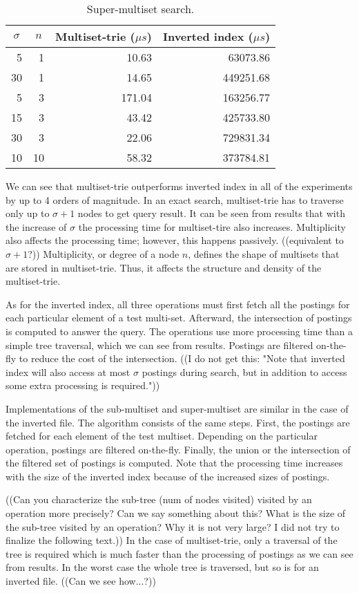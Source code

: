 \begin{table}[h]
\center
\begin{tabular}{|r|r|r|r|}
\hline
\multicolumn{1}{|c|}{$\sigma$} & 
\multicolumn{1}{c|}{$n$} & 
\multicolumn{1}{c|}{Multiset-trie ($\mu s$)} & 
\multicolumn{1}{c|}{Inverted index ($\mu s$)} \\
\hline
5		& 1 		& 10.63 & 63073.86\\
\hline
30	& 1 		& 14.65 & 449251.68\\
\hline
5		& 3 		& 171.04 & 163256.77\\
\hline
15	& 3 		& 43.42 & 425733.80\\
\hline
30	& 3 		& 22.06 & 729831.34\\
\hline
10	& 10 	& 58.32 & 373784.81\\
\hline
\end{tabular}
\caption{Super-multiset search.}
\label{t:res_sup}
\end{table}

We can see that multiset-trie outperforms inverted index in all of the experiments by up to 4 orders of magnitude. In an exact search, multiset-trie has to traverse only up to $\sigma+1$ nodes to get query result. It can be seen from results that with the increase of $\sigma$ the processing time for multiset-tire also increases. Multiplicity also affects the processing time; however, this happens passively. ((equivalent to $\sigma+1$?)) Multiplicity, or degree of a node $n$, defines the shape of multisets that are stored in multiset-trie. Thus, it affects the structure and density of the multiset-trie.

As for the inverted index, all three operations must first fetch all the postings for each particular element of a test multi-set. Afterward, the intersection of postings is computed to answer the query. The operations use more processing time than a simple tree traversal, which we can see from results. Postings are filtered on-the-fly to reduce the cost of the intersection. ((I do not get this: "Note that inverted index will also access at most $\sigma$ postings during search, but in addition to access some extra processing is required."))

Implementations of the sub-multiset and super-multiset are similar in the case of the inverted file. The algorithm consists of the same steps. First, the postings are fetched for each element of the test multiset. Depending on the particular operation, postings are filtered on-the-fly. Finally, the union or the intersection of the filtered set of postings is computed. Note that the processing time increases with the size of the inverted index because of the increased sizes of postings. 

((Can you characterize the sub-tree (num of nodes visited) visited by an operation more precisely? Can we say something about this? What is the size of the sub-tree visited by an operation? Why it is not very large? I did not try to finalize the following text.))
In the case of multiset-trie, only a traversal of the tree is required which is much faster than the processing of postings as we can see from results. In the worst case the whole tree is traversed, but so is for an inverted file. ((Can we see how...?))